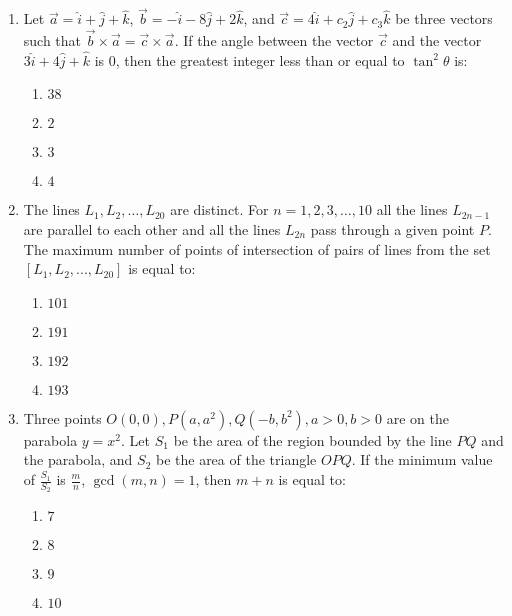 \documentclass[journal]{IEEEtran}
\newcommand{\brak}[1]{\left( #1 \right)}
\newcommand{\sbrak}[1]{\left[ #1 \right]}
\newcommand{\gt}{>}
\begin{document}
\begin{enumerate}
    \item Let $\vec{a}=\hat{i}+\hat{j}+\hat{k}$, $\vec{b}=-\hat{i}-8\hat{j}+2\hat{k}$, and $\vec{c}=4\hat{i}+c_{2}\hat{j}+c_{3}\hat{k}$ be three vectors such that $\vec{b}\times\vec{a}=\vec{c}\times\vec{a}$. If the angle between the vector $\vec{c}$ and the vector $3\hat{i}+4\hat{j}+\hat{k}$ is $0$, then the greatest integer less than or equal to $\tan^{2}\theta$ is:

        \begin{multicols}{4}
        \begin{enumerate}
        \item $38$
        \item $2$
        \item $3$
        \item $4$
        \end{enumerate}
        \end{multicols}

    \item The lines $L_{1}, L_{2}, \ldots, L_{20}$ are distinct. For $n=1, 2, 3, \ldots, 10$ all the lines $L_{2n-1}$ are parallel to each other and all the lines $L_{2n}$ pass through a given point $P$. The maximum number of points of intersection of pairs of lines from the set $\sbrak{L_{1},L_{2},...,L_{20}}$ is equal to:

        \begin{multicols}{4}
        \begin{enumerate}
        \item $101$
        \item $191$
        \item $192$
        \item $193$
        \end{enumerate}
        \end{multicols}

    \item Three points $O\brak{0,0}, P\brak{a,a^{2}}, Q\brak{-b,b^{2}}, a\gt0, b\gt0$ are on the parabola $y=x^{2}$. Let $S_{1}$ be the area of the region bounded by the line $PQ$ and the parabola, and $S_{2}$ be the area of the triangle $OPQ$. If the minimum value of $\frac{S_{1}}{S_{2}}$ is $\frac{m}{n}$, $\gcd\brak{m,n}=1$, then $m+n$ is equal to:

        \begin{multicols}{4}
        \begin{enumerate}
        \item $7$
        \item $8$
        \item $9$
        \item $10$
        \end{enumerate}
        \end{multicols}


\end{enumerate}
\end{document}
